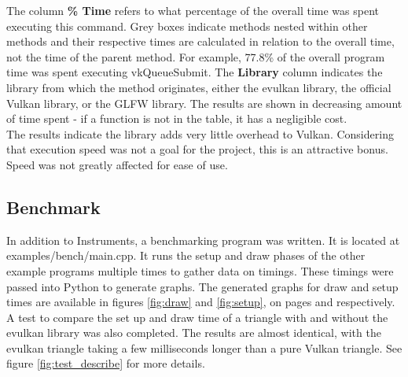 \documentclass[12pt]{report}
\theoremstyle{definition}
\begin{document}
        The column \textbf{\% Time} refers to what percentage of the overall time was
        spent executing this command. Grey boxes indicate methods nested
        within other methods and their respective times are calculated in
        relation to the overall time, not the time of the parent method.
        For example, 77.8\% of the overall program time was spent executing
        vkQueueSubmit. The \textbf{Library} column indicates the library from which
        the method originates, either the evulkan library, the official Vulkan
        library, or the GLFW library. The results are shown in decreasing
        amount of time spent - if a function is not in the table, it has a
        negligible cost. \\

        The results indicate the library adds very little overhead to Vulkan.
        Considering that execution speed was not a goal for the project,
        this is an attractive bonus. Speed was not greatly affected for
        ease of use.

      \subsection{Benchmark}

        In addition to Instruments, a benchmarking program was written. It is
        located at examples/bench/main.cpp. It runs the setup and draw
        phases of the other example programs multiple times to gather
        data on timings. These timings were passed into Python to
        generate graphs. The generated graphs for draw and setup times are available in figures \ref{fig:draw}
        and \ref{fig:setup}, on pages \pageref{fig:draw} and \pageref{fig:setup} respectively. \\

        A test to compare the set up and draw time of a triangle with and
        without the evulkan library was also completed. The results are
        almost identical, with the evulkan triangle taking a few milliseconds
        longer than a pure Vulkan triangle. See figure \ref{fig:test_describe} 
        for more details. \\
\end{document}
